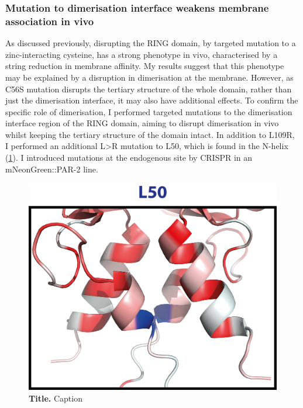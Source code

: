 \documentclass[12pt]{"article"}
\newcommand{\mycaption}[2]{\caption[#1]{\textbf{#1.} #2}}
\begin{document}

\clearpage
\subsubsection{Mutation to dimerisation interface weakens membrane association in vivo}

As discussed previously, disrupting the RING domain, by targeted mutation to a zinc-interacting cysteine, has a strong phenotype in vivo, characterised by a string reduction in membrane affinity. My results suggest that this phenotype may be explained by a disruption in dimerisation at the membrane. However, as C56S mutation disrupts the tertiary structure of the whole domain, rather than just the dimerisation interface, it may also have additional effects. To confirm the specific role of dimerisation, I performed targeted mutations to the dimerisation interface region of the RING domain, aiming to disrupt dimerisation in vivo whilst keeping the tertiary structure of the domain intact. In addition to L109R, I performed an additional L>R mutation to L50, which is found in the N-helix (\cref{fig:l50_structure}). I introduced mutations at the endogenous site by CRISPR in an mNeonGreen::PAR-2 line. \\

\begin{figure}[!h]
\includegraphics[scale=0.9]{l50_structure}
\setlength{\abovecaptionskip}{20pt}
\centering
\mycaption{Title}{Caption}
\label{fig:l50_structure}
\end{figure}
\end{document}
